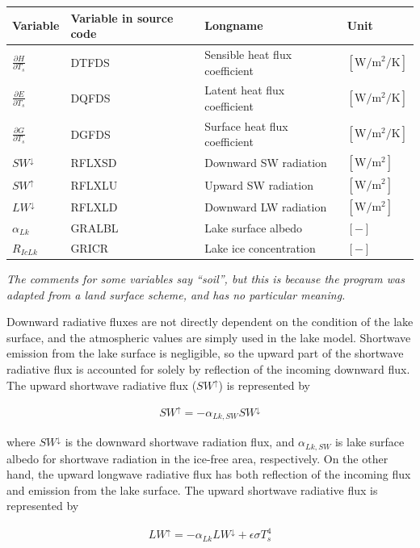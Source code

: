 \begin{longtable}[]{@{}llll@{}}
\toprule\noalign{}
Variable & Variable in source code & Longname & Unit \\
\midrule\noalign{}
\endhead
\bottomrule\noalign{}
\endlastfoot
\(\frac{\partial H}{\partial T_s}\) & DTFDS & Sensible heat flux coefficient & \(\mathrm{[W/m^2/K]}\) \\
\(\frac{\partial E}{\partial T_s}\) & DQFDS & Latent heat flux coefficient & \(\mathrm{[W/m^2/K]}\) \\
\(\frac{\partial G}{\partial T_s}\) & DGFDS & Surface heat flux coefficient & \(\mathrm{[W/m^2/K]}\) \\
\(SW^\downarrow\) & RFLXSD & Downward SW radiation & \(\mathrm{[W/m^2]}\) \\
\(SW^\uparrow\) & RFLXLU & Upward SW radiation & \(\mathrm{[W/m^2]}\) \\
\(LW^\downarrow\) & RFLXLD & Downward LW radiation & \(\mathrm{[W/m^2]}\) \\
\(\alpha_{Lk}\) & GRALBL & Lake surface albedo & \(\mathrm{[-]}\) \\
\(R_{IcLk}\) & GRICR & Lake ice concentration & \(\mathrm{[-]}\) \\
\end{longtable}

\emph{The comments for some variables say ``soil'', but this is because the program was adapted from a land surface scheme, and has no particular meaning.}

Downward radiative fluxes are not directly dependent on the condition of the lake surface, and the atmospheric values are simply used in the lake model. Shortwave emission from the lake surface is
negligible, so the upward part of the shortwave radiative flux is accounted for solely by reflection of the incoming downward flux. The upward shortwave radiative flux (\(SW^\uparrow\)) is represented
by

\begin{eqnarray}
    SW^\uparrow = - \alpha_{Lk,SW} SW^\downarrow
\end{eqnarray}

where \(SW^\downarrow\) is the downward shortwave radiation flux, and \(\alpha_{Lk,SW}\) is lake surface albedo for shortwave radiation in the ice-free area, respectively. On the other hand, the
upward longwave radiative flux has both reflection of the incoming flux and emission from the lake surface. The upward shortwave radiative flux is represented by

\begin{eqnarray}
    LW^\uparrow = - \alpha_{Lk} LW^\downarrow + \epsilon \sigma T_s ^4
\end{eqnarray}

